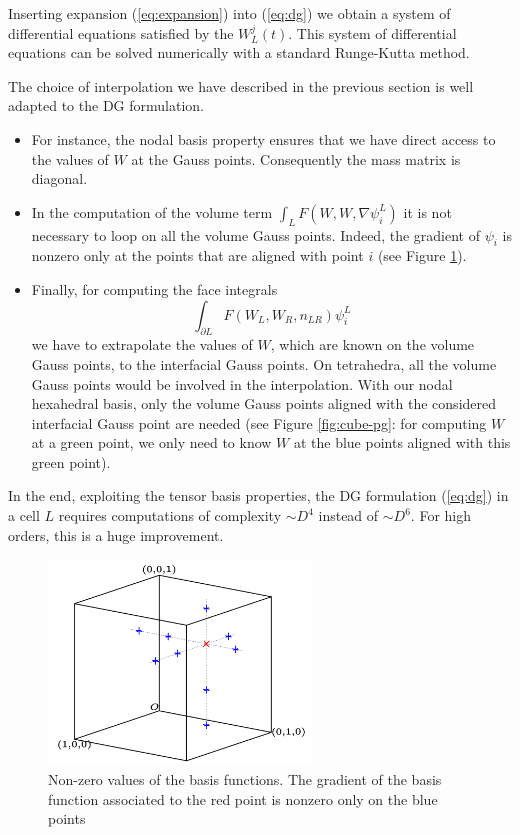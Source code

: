 \documentclass[12pt]{amsart}
\begin{document}
Inserting expansion (\ref{eq:expansion}) into (\ref{eq:dg}) we obtain a system of differential equations satisfied by the
$W_{L}^{j}(t)$. This system of differential equations can be solved numerically with a standard Runge-Kutta method.

The choice of interpolation we have described in the previous section is well adapted to the DG formulation.
\begin{itemize}
\item
For instance, the nodal basis property ensures that we have direct access to the values of $W$ at the Gauss points. Consequently the mass matrix is diagonal.

\item In the computation of the volume term $ \int_{L}F(W,W,\nabla\psi_{i}^{L})$ it is not necessary to loop on all the volume Gauss points. Indeed, the gradient of $\psi_{i}$ is nonzero only at the points that are aligned with point $i$ (see Figure \ref{fig:cross}).


\item Finally, for computing the face integrals $$\int_{\partial L}F(W_{L},W_{R},n_{LR})\psi_{i}^{L}$$ we have to extrapolate the values of $W$, which are known on the volume Gauss points, to the interfacial Gauss points. On tetrahedra, all the volume Gauss points would be involved in the interpolation. With our nodal hexahedral basis, only the volume Gauss points aligned with the considered interfacial Gauss point are needed (see Figure \ref{fig:cube-pg}: for computing $W$ at a green point, we only need to know $W$ at the blue points aligned with this green point).
\end{itemize}

In the end, exploiting the tensor basis properties, the DG formulation (\ref{eq:dg}) in a cell $L$ requires computations of complexity $\sim D^4$ instead of $\sim D^6$. For high orders, this is a huge improvement.

\begin{figure}[h]
  \centering
  \includegraphics[width=7cm]{ref_element_cross_pg}
  \caption{Non-zero values of the basis functions. The gradient of the basis function associated to the red point is nonzero only on the blue points}
  \label{fig:cross}
\end{figure}
\end{document}
